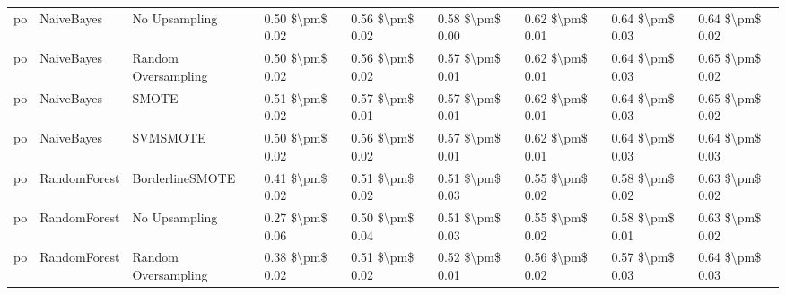 \begin{tabular}{lllllllll}
      po &                      NaiveBayes &                 No Upsampling & 0.50 \$\textbackslash pm\$ 0.02 &           0.56 \$\textbackslash pm\$ 0.02 &       0.58 \$\textbackslash pm\$ 0.00 &        0.62 \$\textbackslash pm\$ 0.01 &                         0.64 \$\textbackslash pm\$ 0.03 &     0.64 \$\textbackslash pm\$ 0.02 \\
      po &                      NaiveBayes &           Random Oversampling & 0.50 \$\textbackslash pm\$ 0.02 &           0.56 \$\textbackslash pm\$ 0.02 &       0.57 \$\textbackslash pm\$ 0.01 &        0.62 \$\textbackslash pm\$ 0.01 &                         0.64 \$\textbackslash pm\$ 0.03 &     0.65 \$\textbackslash pm\$ 0.02 \\
      po &                      NaiveBayes &                         SMOTE & 0.51 \$\textbackslash pm\$ 0.02 &           0.57 \$\textbackslash pm\$ 0.01 &       0.57 \$\textbackslash pm\$ 0.01 &        0.62 \$\textbackslash pm\$ 0.01 &                         0.64 \$\textbackslash pm\$ 0.03 &     0.65 \$\textbackslash pm\$ 0.02 \\
      po &                      NaiveBayes &                      SVMSMOTE & 0.50 \$\textbackslash pm\$ 0.02 &           0.56 \$\textbackslash pm\$ 0.02 &       0.57 \$\textbackslash pm\$ 0.01 &        0.62 \$\textbackslash pm\$ 0.01 &                         0.64 \$\textbackslash pm\$ 0.03 &     0.64 \$\textbackslash pm\$ 0.03 \\
      po &                    RandomForest &               BorderlineSMOTE & 0.41 \$\textbackslash pm\$ 0.02 &           0.51 \$\textbackslash pm\$ 0.02 &       0.51 \$\textbackslash pm\$ 0.03 &        0.55 \$\textbackslash pm\$ 0.02 &                         0.58 \$\textbackslash pm\$ 0.02 &     0.63 \$\textbackslash pm\$ 0.02 \\
      po &                    RandomForest &                 No Upsampling & 0.27 \$\textbackslash pm\$ 0.06 &           0.50 \$\textbackslash pm\$ 0.04 &       0.51 \$\textbackslash pm\$ 0.03 &        0.55 \$\textbackslash pm\$ 0.02 &                         0.58 \$\textbackslash pm\$ 0.01 &     0.63 \$\textbackslash pm\$ 0.02 \\
      po &                    RandomForest &           Random Oversampling & 0.38 \$\textbackslash pm\$ 0.02 &           0.51 \$\textbackslash pm\$ 0.02 &       0.52 \$\textbackslash pm\$ 0.01 &        0.56 \$\textbackslash pm\$ 0.02 &                         0.57 \$\textbackslash pm\$ 0.03 &     0.64 \$\textbackslash pm\$ 0.03 \\

\end{tabular}

